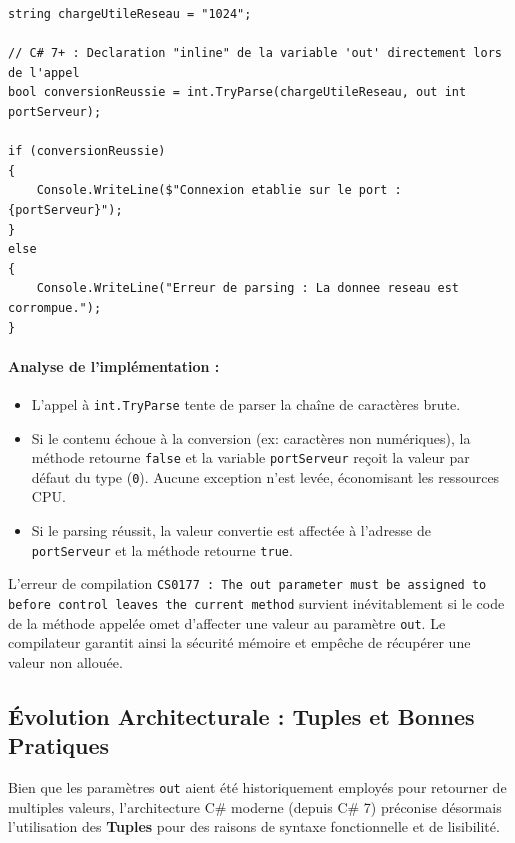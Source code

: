 \begin{lstlisting}[caption={Pattern Try-Parse avec déclaration inline}]
string chargeUtileReseau = "1024";

// C# 7+ : Declaration "inline" de la variable 'out' directement lors de l'appel
bool conversionReussie = int.TryParse(chargeUtileReseau, out int portServeur);

if (conversionReussie)
{
    Console.WriteLine($"Connexion etablie sur le port : {portServeur}");
}
else
{
    Console.WriteLine("Erreur de parsing : La donnee reseau est corrompue.");
}
\end{lstlisting}

\paragraph{Analyse de l'implémentation :}
\begin{itemize}
    \item L'appel à \texttt{int.TryParse} tente de parser la chaîne de caractères brute.
    \item Si le contenu échoue à la conversion (ex: caractères non numériques), la méthode retourne \texttt{false} et la variable \texttt{portServeur} reçoit la valeur par défaut du type (\texttt{0}). Aucune exception n'est levée, économisant les ressources CPU.
    \item Si le parsing réussit, la valeur convertie est affectée à l'adresse de \texttt{portServeur} et la méthode retourne \texttt{true}.
\end{itemize}

\begin{tcolorbox}[colback=backcolour,colframe=stringcolor,title=\textbf{Pièges courants : Rupture du contrat out}]
    L'erreur de compilation \texttt{CS0177 : The out parameter must be assigned to before control leaves the current method} survient inévitablement si le code de la méthode appelée omet d'affecter une valeur au paramètre \texttt{out}. Le compilateur garantit ainsi la sécurité mémoire et empêche de récupérer une valeur non allouée.
\end{tcolorbox}

\subsection{Évolution Architecturale : Tuples et Bonnes Pratiques}

Bien que les paramètres \texttt{out} aient été historiquement employés pour retourner de multiples valeurs, l'architecture C\# moderne (depuis C\# 7) préconise désormais l'utilisation des \textbf{Tuples} pour des raisons de syntaxe fonctionnelle et de lisibilité. 

